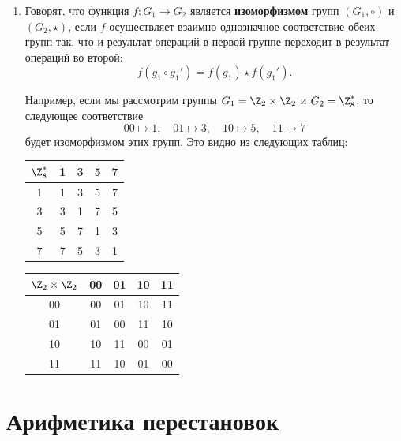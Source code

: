 \begin{enumerate}
\item Говорят, что функция $f:G_1\to G_2$ является \textbf{изоморфизмом} групп $(G_1,\circ)$ и $(G_2,\star)$, если $f$ осуществляет взаимно однозначное соответствие обеих групп так, что и результат операций в первой группе переходит в результат операций во второй:
$$
f(g_1\circ g_1') = f(g_1)\star f(g_1').
$$

Например, если мы рассмотрим группы $G_1=\Z_2\times\Z_2$ и $G_2=\Z_8^*$, то следующее соответствие
$$
00\mapsto 1,\quad 01\mapsto 3,\quad 10\mapsto 5, \quad 11\mapsto 7
$$
будет изоморфизмом этих групп. Это видно из следующих таблиц:

\begin{center}
\begin{tabular}{c|cccc}
$\Z_8^*$ & 1 & 3 & \cellcolor{lightRed} 5 & 7 \\  \hline
1 & 1 & 3 & 5 & 7 \\
3 & 3 & 1 & 7 & 5\\
5 & 5 & 7 & 1 & 3\\
7 & 7 & \cellcolor{lightRed} 5 & 3 & 1
\end{tabular}
\qquad
\begin{tabular}{c|cccc}
$\Z_2\times\Z_2$ & 00 & 01 & \cellcolor{lightRed} 10 & 11\\  \hline
00 & 00 & 01 & 10 & 11 \\
01 & 01 & 00 & 11 & 10 \\
10 & 10 & 11 & 00 & 01 \\
11 & 11 & \cellcolor{lightRed} 10 & 01 & 00
\end{tabular}
\end{center}

\end{enumerate}





\section{Арифметика перестановок}


